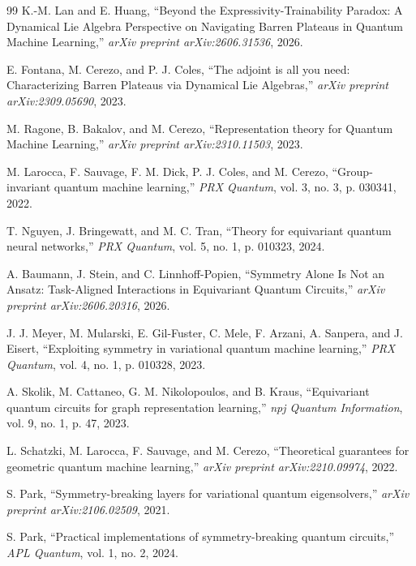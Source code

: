 \documentclass[pdflatex,sn-mathphys-num]{sn-jnl}
\theoremstyle{thmstyleone}
\theoremstyle{thmstyletwo}
\theoremstyle{thmstylethree}
\begin{document}
\begin{thebibliography}{99}
K.-M. Lan and E. Huang, ``Beyond the Expressivity-Trainability Paradox: A Dynamical Lie Algebra Perspective on Navigating Barren Plateaus in Quantum Machine Learning,'' \textit{arXiv preprint arXiv:2606.31536}, 2026.

E. Fontana, M. Cerezo, and P. J. Coles, ``The adjoint is all you need: Characterizing Barren Plateaus via Dynamical Lie Algebras,'' \textit{arXiv preprint arXiv:2309.05690}, 2023.

M. Ragone, B. Bakalov, and M. Cerezo, ``Representation theory for Quantum Machine Learning,'' \textit{arXiv preprint arXiv:2310.11503}, 2023.

M. Larocca, F. Sauvage, F. M. Dick, P. J. Coles, and M. Cerezo, ``Group-invariant quantum machine learning,'' \textit{PRX Quantum}, vol. 3, no. 3, p. 030341, 2022.

T. Nguyen, J. Bringewatt, and M. C. Tran, ``Theory for equivariant quantum neural networks,'' \textit{PRX Quantum}, vol. 5, no. 1, p. 010323, 2024.

A. Baumann, J. Stein, and C. Linnhoff-Popien, ``Symmetry Alone Is Not an Ansatz: Task-Aligned Interactions in Equivariant Quantum Circuits,'' \textit{arXiv preprint arXiv:2606.20316}, 2026.

J. J. Meyer, M. Mularski, E. Gil-Fuster, C. Mele, F. Arzani, A. Sanpera, and J. Eisert, ``Exploiting symmetry in variational quantum machine learning,'' \textit{PRX Quantum}, vol. 4, no. 1, p. 010328, 2023.

A. Skolik, M. Cattaneo, G. M. Nikolopoulos, and B. Kraus, ``Equivariant quantum circuits for graph representation learning,'' \textit{npj Quantum Information}, vol. 9, no. 1, p. 47, 2023.

L. Schatzki, M. Larocca, F. Sauvage, and M. Cerezo, ``Theoretical guarantees for geometric quantum machine learning,'' \textit{arXiv preprint arXiv:2210.09974}, 2022.

S. Park, ``Symmetry-breaking layers for variational quantum eigensolvers,'' \textit{arXiv preprint arXiv:2106.02509}, 2021.

S. Park, ``Practical implementations of symmetry-breaking quantum circuits,'' \textit{APL Quantum}, vol. 1, no. 2, 2024.


\end{thebibliography}
\end{document}
